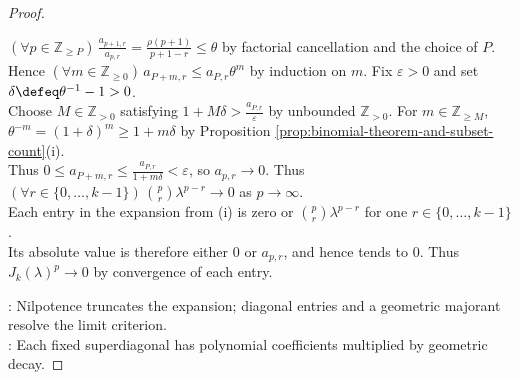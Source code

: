 \begin{proposition}
\begin{proof}
\begin{enumerate}[label=(\roman*)]
$(\forall p\in\mathbb{Z}_{\geq P})\,\frac{a_{p+1,r}}{a_{p,r}}=\frac{\rho(p+1)}{p+1-r}\leq\theta$ by factorial cancellation and the choice of $P$.\\
Hence $(\forall m\in\mathbb{Z}_{\geq0})\,a_{P+m,r}\leq a_{P,r}\theta^m$ by induction on $m$. Fix $\varepsilon>0$ and set $\delta\defeq\theta^{-1}-1>0$.\\
Choose $M\in\mathbb{Z}_{>0}$ satisfying $1+M\delta>\frac{a_{P,r}}{\varepsilon}$ by unbounded $\mathbb{Z}_{>0}$. For $m\in\mathbb{Z}_{\geq M}$, $\theta^{-m}=(1+\delta)^m\geq1+m\delta$ by Proposition \ref{prop:binomial-theorem-and-subset-count}(i).\\
Thus $0\leq a_{P+m,r}\leq\frac{a_{P,r}}{1+m\delta}<\varepsilon$, so $a_{p,r}\to0$. Thus $(\forall r\in\{0,\ldots,k-1\})\,\binom{p}{r}\lambda^{p-r}\to0$ as $p\to\infty$.\\
Each entry in the expansion from (i) is zero or $\binom{p}{r}\lambda^{p-r}$ for one $r\in\{0,\ldots,k-1\}$.\\
Its absolute value is therefore either $0$ or $a_{p,r}$, and hence tends to $0$. Thus $J_k(\lambda)^p\to0$ by convergence of each entry.
\end{enumerate}
: Nilpotence truncates the expansion; diagonal entries and a geometric majorant resolve the limit criterion.\\
: Each fixed superdiagonal has polynomial coefficients multiplied by geometric decay.
\end{proof}
\end{proposition}
